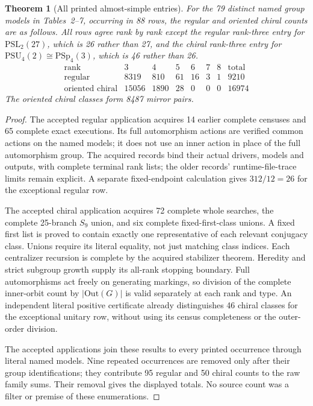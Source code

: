 \documentclass[11pt,a4paper]{article}
\newtheorem{theorem}{Theorem}
\begin{document}
\begin{theorem}[All printed almost-simple entries]
For the 79 distinct named group models in Tables~2--7, occurring in 88 rows,
the regular and oriented chiral counts are as follows. All rows agree rank
by rank except the regular rank-three entry for $\mathrm{PSL}_2(27)$,
which is 26 rather than 27, and the chiral rank-three entry for
$\mathrm{PSU}_4(2)\cong\mathrm{PSp}_4(3)$, which is 46 rather than 26.
\[
\begin{array}{c|rrrrrr|r}
\text{rank}&3&4&5&6&7&8&\text{total}\\\hline
\text{regular}&8319&810&61&16&3&1&9210\\
\text{oriented chiral}&15056&1890&28&0&0&0&16974
\end{array}
\]
The oriented chiral classes form 8487 mirror pairs.
\end{theorem}
\begin{proof}
The accepted regular application acquires 14 earlier complete censuses and
65 complete exact executions. Its full automorphism actions are verified
common actions on the named models; it does not use an inner action in place
of the full automorphism group. The acquired records bind their actual drivers,
models and outputs, with complete terminal rank lists; the older records'
runtime-file-trace limits remain explicit. A separate fixed-endpoint
calculation gives $312/12=26$ for the exceptional regular row.

The accepted chiral application acquires 72 complete whole searches, the
complete 25-branch $S_9$ union, and six complete fixed-first-class unions.
A fixed first list is proved to contain exactly one representative of each
relevant conjugacy class. Unions require its literal equality, not just
matching class indices. Each centralizer recursion is complete by the
acquired stabilizer theorem. Heredity and strict subgroup growth supply its
all-rank stopping boundary. Full automorphisms act freely on generating
markings, so division of the complete inner-orbit count by $|\mathrm{Out}(G)|$
is valid separately at each rank and type. An independent literal positive
certificate already distinguishes 46 chiral classes for the exceptional
unitary row, without using its census completeness or the outer-order division.

The accepted applications join these results to every printed occurrence
through literal named models. Nine repeated occurrences are removed only
after their group identifications; they contribute 95 regular and 50 chiral
counts to the raw family sums. Their removal gives the displayed totals.
No source count was a filter or premise of these enumerations.
\end{proof}
\end{document}
